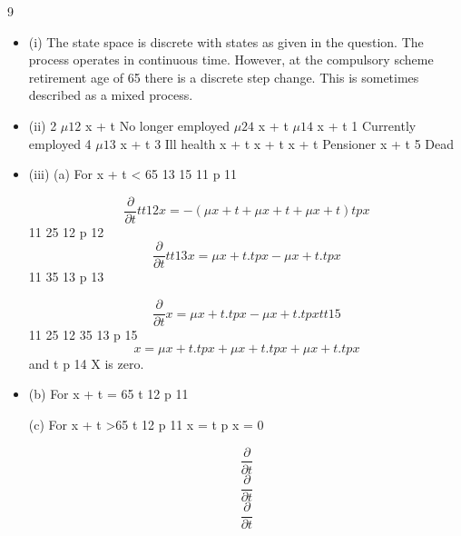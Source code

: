 \documentclass[a4paper,12pt]{article}
\begin{document}
9
\begin{itemize}
\item (i)
The state space is discrete with states as given in the question.
The process operates in continuous time.
However, at the compulsory scheme retirement
age of 65 there is a discrete step change.
This is sometimes described as a mixed process.


\item (ii)
2
$\mu12$
x + t
No longer
employed
$\mu 24$
x + t
$\mu 14$
x + t
1
Currently
employed
4
$\mu 13$
x + t
3
Ill health
x + t
x + t
x + t
Pensioner
x + t
5
Dead
\item (iii)
(a)
For x + t < 65
13
15
11
p 11

\[\frac{\partial}{\partial t}  t t 12 x = − ( \mu x + t + \mu x + t + \mu x + t ) t p x \]
11
25
12
p 12
\[
\frac{\partial}{\partial t}  t t 13 x = \mu x + t . t p x − \mu x + t . t p x\]
11
35
13
p 13

\[\frac{\partial}{\partial t} x = \mu x + t . t p x − \mu x + t . t p x t t 15\]
11
25
12
35
13
p 15
\[x = \mu x + t . t p x + \mu x + t . t p x + \mu x + t . t p x\]
and t p 14
X is zero.

\item (b)
For x + t = 65
t
12
p 11

(c)
For x + t >65
t
12
p 11
x = t p x = 0

\[\frac{\partial}{\partial t} \]
\[\frac{\partial}{\partial t} \]
\[\frac{\partial}{\partial t} \]
\end{itemize}
\end{document}
